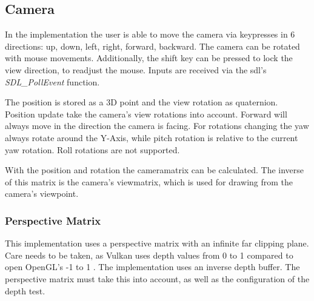 








\subsection{Camera}
In the implementation the user is able to move the camera via keypresses in 6 directions: up, down, left, right, forward, backward. The camera can be rotated  with mouse movements. Additionally, the shift key can be pressed to lock the view direction, to readjust the mouse. Inputs are received via the \gls{sdl}'s \cite{sdl} \textit{SDL\_PollEvent} function.

The position is stored as a 3D point and the view rotation as quaternion. Position update take the camera's view rotations into account. Forward will always move in the direction the camera is facing. For rotations changing the yaw always rotate around the Y-Axis, while pitch rotation is relative to the current yaw rotation. Roll rotations are not supported.

With the position and rotation the \gls{cameramatrix} can be calculated. The inverse of this matrix is the camera's \gls{viewmatrix}, which is used for drawing from the camera's viewpoint.

\subsubsection{Perspective Matrix}
This implementation uses a perspective matrix with an infinite far clipping plane. Care needs to be taken, as Vulkan uses depth values from 0 to 1 \cite{khronos:vulkan:spec1.1} compared to open OpenGL's -1 to 1 \cite{khronos:openGL:spec4.6}. The implementation uses an inverse depth buffer. The perspective matrix must take this into account, as well as the configuration of the depth test.


